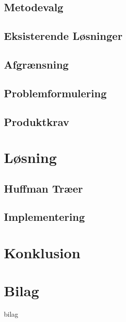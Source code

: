 \documentclass[12pt]{report}
\begin{document}
	\section{Metodevalg}
	

	\section{Eksisterende Løsninger}
	

	\section{Afgrænsning}
	

	\section{Problemformulering}
		
	
	\section{Produktkrav}
	
	



\chapter{Løsning}

	\section{Huffman Træer}
	

   \section{Implementering}
   
   

\chapter{Konklusion}






\chapter*{Bilag}
 {bilag}
\end{document}

